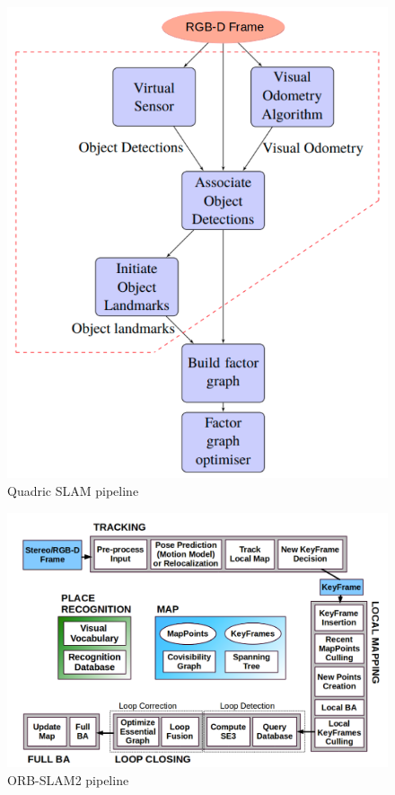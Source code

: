 \documentclass[report.tex]{subfiles}
\begin{document}
\begin{figure}[H]
\centering
\includegraphics[scale=0.35] {Images/qslam.png}
\caption{\centering Quadric SLAM pipeline \cite{dataassosciation}}
\label{fig:qslam.png}
\end{figure}

\begin{figure}[H]
\centering
\includegraphics[scale=0.3] {Images/orb_slam2.png}
\caption{\centering ORB-SLAM2 pipeline \cite{orbslam2}}
\label{fig:orb_slam2.png}
\end{figure}
\end{document}
